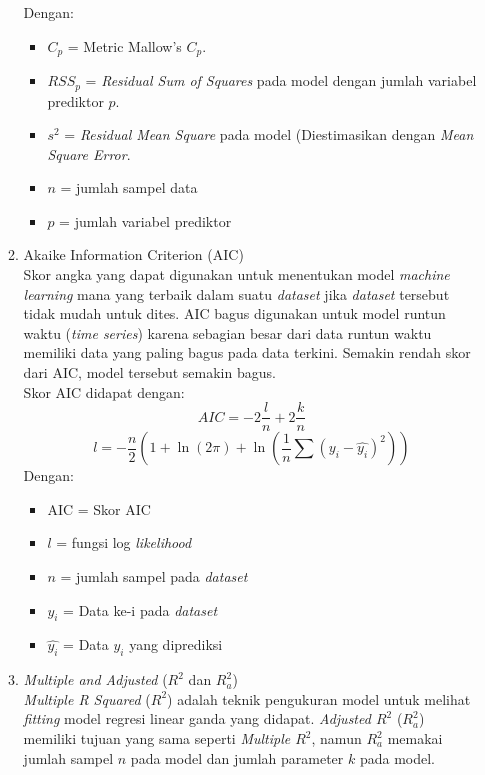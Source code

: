 \begin{enumerate}
\begin{enumerate}
    Dengan:
    \begin{itemize}
        \item $C_p$ = Metric Mallow's $C_p$.
        \item $RSS_p$ = \textit{Residual Sum of Squares} pada model dengan jumlah variabel prediktor $p$.
        \item $s^2$ = \textit{Residual Mean Square} pada model (Diestimasikan dengan \textit{Mean Square Error}.
        \item $n$ = jumlah sampel data
        \item $p$ = jumlah variabel prediktor
    \end{itemize}
    \item Akaike Information Criterion (AIC) \\
    Skor angka yang dapat digunakan untuk menentukan model \textit{machine learning} mana yang terbaik dalam suatu \textit{dataset} jika \textit{dataset} tersebut tidak mudah untuk dites. AIC bagus digunakan untuk model runtun waktu (\textit{time series}) karena sebagian besar dari data runtun waktu memiliki data yang paling bagus pada data terkini. Semakin rendah skor dari AIC, model tersebut semakin bagus. \\
    Skor AIC didapat dengan:
    \begin{equation*}
        AIC = -2\frac{l}{n} + 2\frac{k}{n} 
    \end{equation*}
    \begin{equation*}
        l = -\frac{n}{2}(1 + \ln(2\pi) + \ln(\frac{1}{n}\sum(y_i - \hat{y_i})^2)) 
    \end{equation*}
    Dengan:
    \begin{itemize}
        \item AIC = Skor AIC
        \item $l$ = fungsi log \textit{likelihood}
        \item $n$ = jumlah sampel pada \textit{dataset}
        \item $y_i$ = Data ke-i pada \textit{dataset}
        \item $\hat{y_i}$ = Data $y_i$ yang diprediksi
    \end{itemize}
    \item \textit{Multiple and Adjusted} ($R^2$ dan $R^2_a$) \\
    \textit{Multiple R Squared} ($R^2$) adalah teknik pengukuran model untuk melihat \textit{fitting} model regresi linear ganda yang didapat. \textit{Adjusted $R^2$} ($R^2_a$) memiliki tujuan yang sama seperti \textit{Multiple $R^2$}, namun $R^2_a$ memakai jumlah sampel $n$ pada model dan jumlah parameter $k$ pada model. \\

\end{enumerate}
\end{enumerate}
